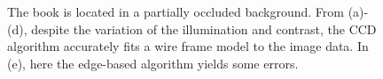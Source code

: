 \begin{figure}[htbp]
\begin{minipage}[t]{0.5\linewidth}
    \label{subfig:iteration 3}
  \end{minipage} 
  \begin{minipage}[t]{0.5\linewidth} 
    \centering 
  \end{minipage}
  \begin{minipage}[t]{\linewidth} 
    \centering 
  \end{minipage} 
\caption[Fitting a rigid wire frame in a inhomogeneous background]{The book
  is located in a partially occluded background. From (a)-(d), despite
the variation of the illumination and contrast, the CCD algorithm
accurately fits a wire frame model to the image data. In (e), here the
edge-based algorithm yields some errors.}
\label{fig:wireframe}
\end{figure}


